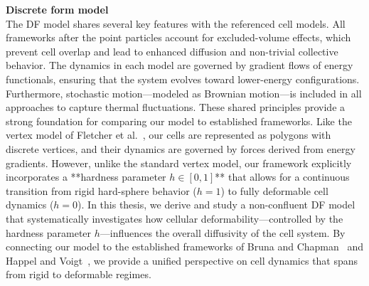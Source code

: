 
\textbf{Discrete form model} \\ 
The DF model shares several key features with the referenced cell models. 
All frameworks after the point particles account for excluded-volume effects, which prevent cell overlap and lead to enhanced diffusion and non-trivial collective behavior. 
The dynamics in each model are governed by gradient flows of energy functionals, ensuring that the system evolves toward lower-energy configurations. 
Furthermore, stochastic motion—modeled as Brownian motion—is included in all approaches to capture thermal fluctuations. 
These shared principles provide a strong foundation for comparing our model to established frameworks.
Like the vertex model of Fletcher et al.~\cite{Fletcher14}, our cells are represented as polygons with discrete vertices, and their dynamics are governed by forces derived from energy gradients. 
However, unlike the standard vertex model, our framework explicitly incorporates a **hardness parameter $h \in [0,1]$** that allows for a continuous transition from rigid hard-sphere behavior ($h=1$) to fully deformable cell dynamics ($h=0$).
In this thesis, we derive and study a non-confluent DF model that systematically investigates how cellular deformability—controlled by the hardness parameter $h$—influences the overall diffusivity of the cell system. 
By connecting our model to the established frameworks of Bruna and Chapman~\cite{Bruna2012, Bruna2017} and Happel and Voigt~\cite{Happel2023}, we provide a unified perspective on cell dynamics that spans from rigid to deformable regimes.


